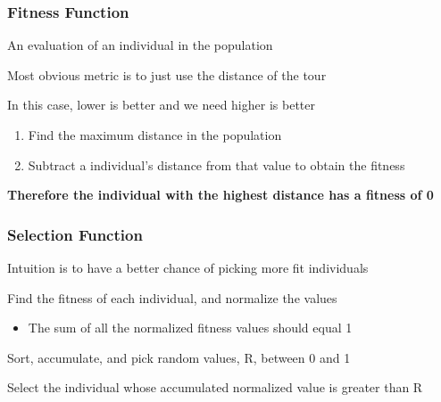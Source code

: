 \documentclass[aspectratio=169,10pt,compress]{beamer}
\begin{document}
\begin{frame}
  \frametitle{Fitness Function}

  An evaluation of an individual in the population

  \vspace{2em}

  Most obvious metric is to just use the distance of the tour

  In this case, lower is better and we need higher is better

  \vspace{2em}

  \begin{enumerate}
    \item Find the maximum distance in the population
    \item Subtract a individual's distance from that value to obtain the fitness
  \end{enumerate}

  \vspace{2em}

  {\bf Therefore the individual with the highest distance has a fitness of 0}
\end{frame}

\begin{frame}
  \frametitle{Selection Function}

  Intuition is to have a better chance of picking more fit individuals

  \vspace{2em}
  
  Find the fitness of each individual, and normalize the values
  \begin{itemize}
    \item The sum of all the normalized fitness values should equal 1
  \end{itemize}

  \vspace{2em}
  
  Sort, accumulate, and pick random values, R, between 0 and 1

  \vspace{2em}

  Select the individual whose accumulated normalized value is greater than R
\end{frame}
\end{document}
